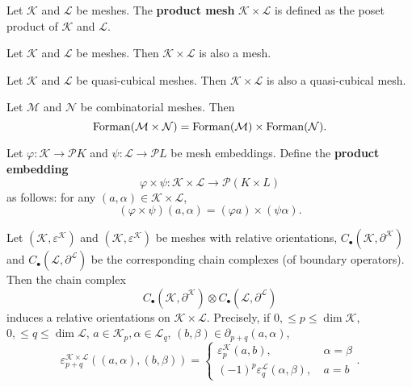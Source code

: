 \begin{definition}
  Let $\mathcal{K}$ and $\mathcal{L}$ be meshes.
  The \textbf{product mesh} $\mathcal{K} \times \mathcal{L}$ is defined as the
  poset product of $\mathcal{K}$ and $\mathcal{L}$.
\end{definition}
\begin{proposition}
  Let $\mathcal{K}$ and $\mathcal{L}$ be meshes.
  Then $\mathcal{K} \times \mathcal{L}$ is also a mesh.
\end{proposition}
\begin{proposition}
  Let $\mathcal{K}$ and $\mathcal{L}$ be quasi-cubical meshes.
  Then $\mathcal{K} \times \mathcal{L}$ is also a quasi-cubical mesh.
\end{proposition}
\begin{proposition}
  Let $\mathcal{M}$ and $\mathcal{N}$ be combinatorial meshes.
  Then
  \begin{equation}
    {\rm Forman}(\mathcal{M} \times \mathcal{N})
    = {\rm Forman}(\mathcal{M}) \times {\rm Forman}(\mathcal{N}).
  \end{equation}
\end{proposition}
\begin{definition}
  Let $\varphi \colon \mathcal{K} \to \mathcal{P} K$ and
    $\psi \colon \mathcal{L} \to \mathcal{P} L$ be
  mesh embeddings.
  Define the \textbf{product embedding}
  \begin{equation}
    \varphi \times \psi \colon
    \mathcal{K} \times \mathcal{L} \to \mathcal{P} (K \times L)
  \end{equation}
  as follows: for any $(a, \alpha) \in \mathcal{K} \times \mathcal{L}$,
  \begin{equation}
    (\varphi \times \psi)(a, \alpha) = (\varphi a) \times (\psi \alpha).
  \end{equation}
\end{definition}
\begin{proposition}
  Let
    $(\mathcal{K}, \varepsilon^{\mathcal{K}})$ and
      $(\mathcal{K}, \varepsilon^{\mathcal{K}})$
      be meshes with relative orientations,
    $C_\bullet(\mathcal{K}, \partial^{\mathcal{K}})$ and
      $C_\bullet(\mathcal{L}, \partial^{\mathcal{L}})$
    be the corresponding chain complexes (of boundary operators).
  Then the chain complex
  \begin{equation}
    C_\bullet(\mathcal{K}, \partial^{\mathcal{K}}) \otimes
    C_\bullet(\mathcal{L}, \partial^{\mathcal{L}})
  \end{equation}
  induces a relative orientations on $\mathcal{K} \times \mathcal{L}$.
  Precisely, if $0, \leq p \leq \dim \mathcal{K}$,
  $0, \leq q \leq \dim \mathcal{L}$,
  $a \in \mathcal{K}_p, \alpha \in \mathcal{L}_{q}$,
  $(b, \beta) \in \partial_{p + q}(a, \alpha)$,
  \begin{equation}
    \varepsilon^{\mathcal{K} \times \mathcal{L}}_{p + q}(
      (a, \alpha), (b, \beta)) =
    \begin{cases}
      \varepsilon_p^{\mathcal{K}}(a, b),\ & \alpha = \beta \\
      (-1)^p \varepsilon_q^{\mathcal{L}}(\alpha, \beta),\ & a = b
    \end{cases}.
  \end{equation}
\end{proposition}
